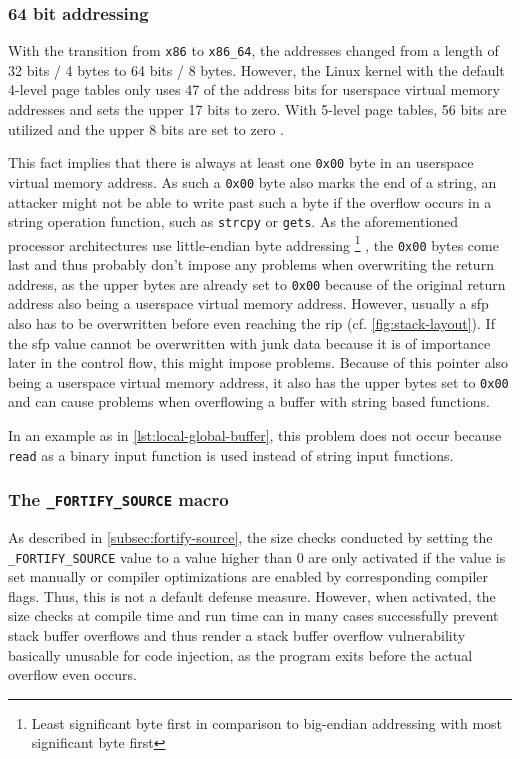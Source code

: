\subsubsection{64 bit addressing}
\label{subsubsec:ci-64bit-addressing}

With the transition from \texttt{x86} to \texttt{x86\_64}, the addresses changed from a length of 32 bits / 4 bytes to 64 bits / 8 bytes.
However, the Linux kernel with the default 4-level page tables only uses 47 of the address bits for userspace virtual memory addresses and sets the upper 17 bits to zero.
With 5-level page tables, 56 bits are utilized and the upper 8 bits are set to zero \cite{Kernel2020}.

This fact implies that there is always at least one \texttt{0x00} byte in an userspace virtual memory address.
As such a \texttt{0x00} byte also marks the end of a string, an attacker might not be able to write past such a byte if the overflow occurs in a string operation function, such as \texttt{strcpy} or \texttt{gets}.
As the aforementioned processor architectures use little-endian byte addressing%
	\footnote{Least significant byte first in comparison to big-endian addressing with most significant byte first}%
, the \texttt{0x00} bytes come last and thus probably don't impose any problems when overwriting the return address, as the upper bytes are already set to \texttt{0x00} because of the original return address also being a userspace virtual memory address. 
However, usually a \gls{sfp} also has to be overwritten before even reaching the \gls{rip} (cf. \cref{fig:stack-layout}).
If the \gls{sfp} value cannot be overwritten with junk data because it is of importance later in the control flow, this might impose problems.
Because of this pointer also being a userspace virtual memory address, it also has the upper bytes set to \texttt{0x00} and can cause problems when overflowing a buffer with string based functions.

In an example as in \cref{lst:local-global-buffer}, this problem does not occur because \texttt{read} as a binary input function is used instead of string input functions.

\subsubsection{The \texttt{\_FORTIFY\_SOURCE} macro}
\label{subsubsec:ci-fortify-source}

As described in \cref{subsec:fortify-source}, the size checks conducted by setting the \texttt{\_FORTIFY\linebreak[0]\_SOURCE} value to a value higher than 0 are only activated if the value is set manually or compiler optimizations are enabled by corresponding compiler flags.
Thus, this is not a default defense measure.
However, when activated, the size checks at compile time and run time can in many cases successfully prevent stack buffer overflows and thus render a stack buffer overflow vulnerability basically unusable for code injection, as the program exits before the actual overflow even occurs.

